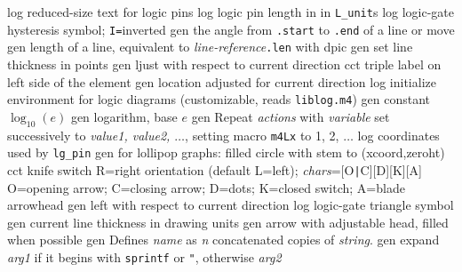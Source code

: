   {log}
  {reduced-size text for logic pins}
  {log}
  {logic pin length in in {\tt L\_unit}s}
  {log}
  {logic-gate hysteresis symbol; {\tt I=}inverted}
  {gen}
  {the angle from {\tt .start} to {\tt .end} of a line or move}
  {gen}
  {length of a line, equivalent to {\sl line-reference}{\tt .len}
   with dpic}
  {gen}
  {set line thickness in points}
  {gen}
  {ljust with respect to current direction}
  {cct}
  {triple label on left side of the element }
  {gen}
  {location adjusted for current direction}
  {log}
  {initialize environment for logic diagrams
    (customizable, reads {\tt liblog.m4})}
  {gen}
  {constant $\log_{10}(e)$}
  {gen}
  {logarithm, base $e$}
  {gen}
  {Repeat {\sl actions} with {\sl variable} set successively to
   {\sl value1, value2, $\ldots$}, setting macro {\tt m4Lx} to 1, 2, $\ldots$}
  {log}
  {coordinates used by {\tt lg\_pin}}
  {gen}
  {for lollipop graphs: filled circle with stem to (xcoord,zeroht)}
  {cct}
  {knife switch R=right orientation (default L=left);
    {\sl chars}=[O{\tt|}C][D][K][A] O=opening arrow; C=closing arrow; D=dots;
    K=closed switch; A=blade arrowhead }
  {gen}
  {left with respect to current direction}
  {log}
  {logic-gate triangle symbol}
  {gen}
  {current line thickness in drawing units}
  {gen}
  {arrow with adjustable head, filled when possible}
  {gen}
  {Defines {\sl name} as {\sl n} concatenated copies of {\sl string}.}
  {gen}
  {expand {\sl arg1} if it begins
    with {\tt sprintf} or {\tt "}, otherwise {\sl arg2}}
